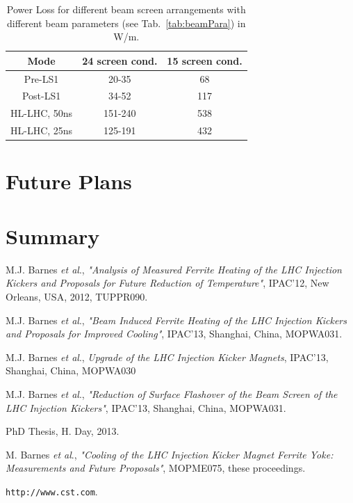 \documentclass[a4paper,
              ]{jacow}
\begin{document}
\begin{table}
\caption{Power Loss for different beam screen arrangements with different beam parameters (see Tab.~\ref{tab:beamPara}) in W/m.}
\label{tab:powLoss}
\begin{center}
\begin{tabular}{c | c | c}
Mode & 24 screen cond. & 15 screen cond. \\ \hline 
Pre-LS1 & 20-35 & 68 \\ \hline 
Post-LS1 & 34-52 & 117 \\ \hline 
HL-LHC, 50ns & 151-240 & 538  \\ \hline 
HL-LHC, 25ns & 125-191 & 432  \\ 
\end{tabular}
\end{center}
\end{table}

\section{Future Plans}


\section{Summary}




\begin{thebibliography}{9}

M.J. Barnes \emph{et al}., \emph{"Analysis of Measured Ferrite Heating of the LHC Injection Kickers and Proposals for Future Reduction of Temperature"}, IPAC'12, New Orleans, USA, 2012, TUPPR090.

M.J. Barnes \emph{et al}., \emph{"Beam Induced Ferrite Heating of the LHC Injection Kickers and Proposals for Improved Cooling"}, IPAC'13, Shanghai, China, MOPWA031.

M.J. Barnes \emph{et al}., \emph{Upgrade of the LHC Injection Kicker Magnets}, IPAC'13, Shanghai, China, MOPWA030

M.J. Barnes \emph{et al}., \emph{"Reduction of Surface Flashover of the Beam Screen of the LHC Injection Kickers"}, IPAC'13, Shanghai, China, MOPWA031.

PhD Thesis, H. Day, 2013.

M. Barnes \emph{et al}., \emph{"Cooling of the LHC Injection Kicker Magnet Ferrite Yoke: Measurements and Future Proposals"}, MOPME075, these proceedings.

\texttt{http://www.cst.com}.

\end{thebibliography}
\end{document}

